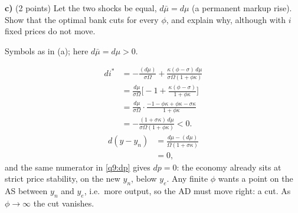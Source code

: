\textbf{c)} (2 points) Let the two shocks be equal, $d\bar\mu=d\mu$ (a permanent markup rise). Show that the optimal bank cuts for every
$\phi$, and explain why, although with $i$ fixed prices do not move.
\resolespaco
\begin{sol}
\begin{notacao}
\item Symbols as in (a); here $d\bar\mu=d\mu>0$.
\end{notacao}
\begin{align*}
di^*&=-\frac{(d\mu)}{\sigma\Omega}+\frac{\kappa(\phi-\sigma)\,d\mu}{\sigma\Omega(1+\phi\kappa)}\\
&=\frac{d\mu}{\sigma\Omega}\Big[-1+\frac{\kappa(\phi-\sigma)}{1+\phi\kappa}\Big]\\
&=\frac{d\mu}{\sigma\Omega}\cdot\frac{-1-\phi\kappa+\phi\kappa-\sigma\kappa}{1+\phi\kappa}\\
&=-\frac{(1+\sigma\kappa)\,d\mu}{\sigma\Omega(1+\phi\kappa)}<0 .
\end{align*}
\begin{align}
d(y-y_n)&=\frac{d\mu-(d\mu)}{\Omega(1+\sigma\kappa)}\nonumber\\
&=0 , \nonumber
\end{align}
and the same numerator in \eqref{q9:dp} gives $dp=0$: the economy already sits at strict price stability, on the new $y_n$, below
$y_e$. Any finite $\phi$ wants a point on the AS between $y_n$ and $y_e$, i.e.\ more output, so the AD must move right: a cut. As $\phi\to\infty$ the cut vanishes.
\end{sol}

